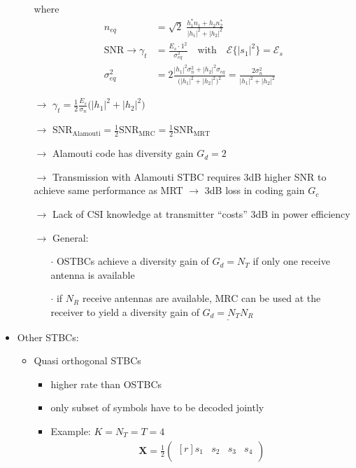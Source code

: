 \documentclass[a4paper, 10pt]{article}
\begin{document}
\begin{itemize}
\begin{itemize}
		where 
		\begin{align*}
			n_{eq} &= \sqrt{2}\;\frac{h_1^*n_1 + h_2n_2^*}{|h_1|^2 + |h_2|^2}\\
			\text{SNR} \rightarrow \gamma _t  &= \frac{E_s\cdot 1^2}{\sigma _{eq}^2}\quad \text{with}\quad \mathcal{E}\bigl\{ |s_1|^2\bigr\} = \mathcal{E}_s\\ 	
			\sigma _{eq}^2 &= 2\frac{|h_1|^2\sigma _n^2 + |h_2|^2\sigma _{eq}}{\bigl(|h_1|^2 + |h_2|^2\bigr)^2} = \frac{2\sigma _n^2}{|h_1|^2 + |h_2|^2}
		\end{align*}
		\item[$\rightarrow$] $\gamma _t = \frac{1}{2}\frac{E_s}{\sigma _n}\bigl ( |h_1|^2 + |h_2|^2\bigr)$
		\item[$\rightarrow$] $\text{SNR}_{\text{Alamouti}} = \frac{1}{2}\text{SNR}_{\text{MRC}} = \frac{1}{2}\text{SNR}_{\text{MRT}}$
		\item[$\rightarrow$] Alamouti code has diversity gain $G_d = 2$
		\item[$\rightarrow$] Transmission with Alamouti STBC requires 3dB higher SNR to achieve same performance as MRT $\rightarrow$  3dB loss in coding gain $G_c$
		\item[$\rightarrow$] Lack of CSI knowledge at transmitter ``costs'' 3dB in power efficiency
		\item[$\rightarrow$] General: 
		\begin{itemize}
			\item[$\cdot$] OSTBCs achieve a diversity gain of $G_d = N_T$ if only one receive antenna is available
			\item[$\cdot$] if $ N_R $ receive antennas are available, MRC can be used at the receiver to yield a diversity gain of $\underline{G_d = N_TN_R}$
		\end{itemize}
	\end{itemize}
\item Other STBCs:
	\begin{itemize}
		\item Quasi orthogonal STBCs
		\begin{itemize}
			\item higher rate than OSTBCs
			\item only subset of symbols have to be decoded jointly
			\item Example: $K = N_T = T = 4$
			\begin{align*}
				\textbf{X} = \frac{1}{2}
				\begin{pmatrix*}[r]
					s_1 & s_2 & s_3 & s_4\\

\end{pmatrix*}
\end{align*}
\end{itemize}
\end{itemize}
\end{itemize}
\end{document}
